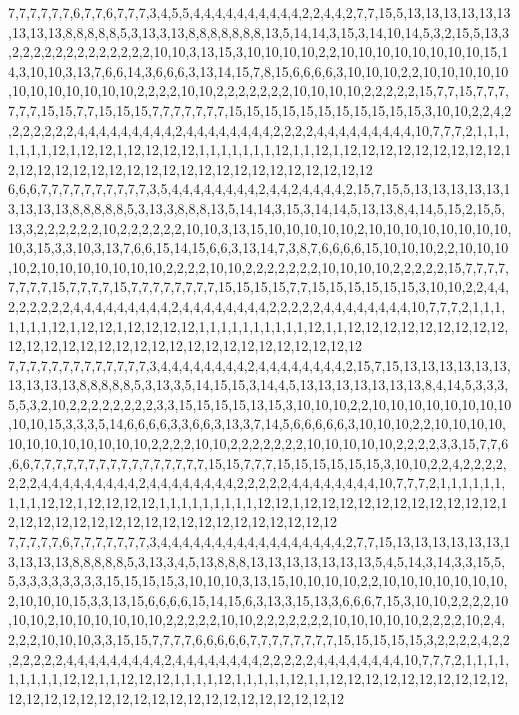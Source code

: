7,7,7,7,7,7,6,7,7,6,7,7,7,3,4,5,5,4,4,4,4,4,4,4,4,4,4,2,2,4,4,2,7,7,15,5,13,13,13,13,13,13,13,13,13,8,8,8,8,8,5,3,13,3,13,8,8,8,8,8,8,8,13,5,14,14,3,15,3,14,10,14,5,3,2,15,5,13,3,2,2,2,2,2,2,2,2,2,2,2,2,2,10,10,3,13,15,3,10,10,10,10,2,2,10,10,10,10,10,10,10,10,15,14,3,10,10,3,13,7,6,6,14,3,6,6,6,3,13,14,15,7,8,15,6,6,6,6,3,10,10,10,2,2,10,10,10,10,10,10,10,10,10,10,10,10,2,2,2,2,10,10,2,2,2,2,2,2,2,10,10,10,10,2,2,2,2,2,15,7,7,15,7,7,7,7,7,7,15,15,7,7,15,15,15,7,7,7,7,7,7,7,15,15,15,15,15,15,15,15,15,15,15,3,10,10,2,2,4,2,2,2,2,2,2,2,4,4,4,4,4,4,4,4,4,2,4,4,4,4,4,4,4,4,2,2,2,2,4,4,4,4,4,4,4,4,4,10,7,7,7,2,1,1,1,1,1,1,1,12,1,12,12,1,12,12,12,12,1,1,1,1,1,1,1,12,1,1,12,1,12,12,12,12,12,12,12,12,12,12,12,12,12,12,12,12,12,12,12,12,12,12,12,12,12,12,12,12,12,12
6,6,6,7,7,7,7,7,7,7,7,7,7,3,5,4,4,4,4,4,4,4,4,2,4,4,2,4,4,4,4,2,15,7,15,5,13,13,13,13,13,13,13,13,13,8,8,8,8,8,5,3,13,3,8,8,8,13,5,14,14,3,15,3,14,14,5,13,13,8,4,14,5,15,2,15,5,13,3,2,2,2,2,2,2,10,2,2,2,2,2,2,10,10,3,13,15,10,10,10,10,10,2,10,10,10,10,10,10,10,10,10,3,15,3,3,10,3,13,7,6,6,15,14,15,6,6,3,13,14,7,3,8,7,6,6,6,6,15,10,10,10,2,2,10,10,10,10,2,10,10,10,10,10,10,10,2,2,2,2,10,10,2,2,2,2,2,2,2,10,10,10,10,2,2,2,2,2,15,7,7,7,7,7,7,7,7,15,7,7,7,7,15,7,7,7,7,7,7,7,7,15,15,15,15,7,7,15,15,15,15,15,15,3,10,10,2,2,4,4,2,2,2,2,2,2,4,4,4,4,4,4,4,4,4,2,4,4,4,4,4,4,4,4,2,2,2,2,2,4,4,4,4,4,4,4,4,10,7,7,7,2,1,1,1,1,1,1,1,12,1,12,12,1,12,12,12,12,1,1,1,1,1,1,1,1,1,1,12,1,1,12,12,12,12,12,12,12,12,12,12,12,12,12,12,12,12,12,12,12,12,12,12,12,12,12,12,12,12,12
7,7,7,7,7,7,7,7,7,7,7,7,7,3,4,4,4,4,4,4,4,4,2,4,4,4,4,4,4,4,4,2,15,7,15,13,13,13,13,13,13,13,13,13,13,8,8,8,8,8,5,3,13,3,5,14,15,15,3,14,4,5,13,13,13,13,13,13,13,8,4,14,5,3,3,3,5,5,3,2,10,2,2,2,2,2,2,2,2,3,3,15,15,15,15,13,15,3,10,10,10,2,2,10,10,10,10,10,10,10,10,10,10,15,3,3,3,5,14,6,6,6,6,3,3,6,6,3,13,3,7,14,5,6,6,6,6,6,3,10,10,10,2,2,10,10,10,10,10,10,10,10,10,10,10,10,2,2,2,2,10,10,2,2,2,2,2,2,2,10,10,10,10,10,2,2,2,2,3,3,15,7,7,6,6,6,7,7,7,7,7,7,7,7,7,7,7,7,7,7,7,7,15,15,7,7,7,15,15,15,15,15,15,3,10,10,2,2,4,2,2,2,2,2,2,2,4,4,4,4,4,4,4,4,4,2,4,4,4,4,4,4,4,4,2,2,2,2,2,4,4,4,4,4,4,4,4,10,7,7,7,2,1,1,1,1,1,1,1,1,1,12,12,1,12,12,12,12,1,1,1,1,1,1,1,1,1,12,12,1,12,12,12,12,12,12,12,12,12,12,12,12,12,12,12,12,12,12,12,12,12,12,12,12,12,12,12,12,12,12
7,7,7,7,7,6,7,7,7,7,7,7,7,3,4,4,4,4,4,4,4,4,4,4,4,4,4,4,4,4,4,2,7,7,15,13,13,13,13,13,13,13,13,13,13,8,8,8,8,8,5,3,13,3,4,5,13,8,8,8,13,13,13,13,13,13,13,5,4,5,14,3,14,3,3,15,5,5,3,3,3,3,3,3,3,3,15,15,15,15,3,10,10,10,3,13,15,10,10,10,10,2,2,10,10,10,10,10,10,10,2,10,10,10,15,3,3,13,15,6,6,6,6,15,14,15,6,3,13,3,15,13,3,6,6,6,7,15,3,10,10,2,2,2,2,10,10,10,2,10,10,10,10,10,10,2,2,2,2,2,10,10,2,2,2,2,2,2,2,10,10,10,10,10,2,2,2,2,10,2,4,2,2,2,10,10,10,3,3,15,15,7,7,7,7,6,6,6,6,6,7,7,7,7,7,7,7,7,15,15,15,15,15,3,2,2,2,2,4,2,2,2,2,2,2,2,4,4,4,4,4,4,4,4,4,2,4,4,4,4,4,4,4,4,2,2,2,2,2,4,4,4,4,4,4,4,4,10,7,7,7,2,1,1,1,1,1,1,1,1,1,12,12,1,1,12,12,12,1,1,1,1,12,1,1,1,1,1,12,1,1,12,12,12,12,12,12,12,12,12,12,12,12,12,12,12,12,12,12,12,12,12,12,12,12,12,12,12,12,12
